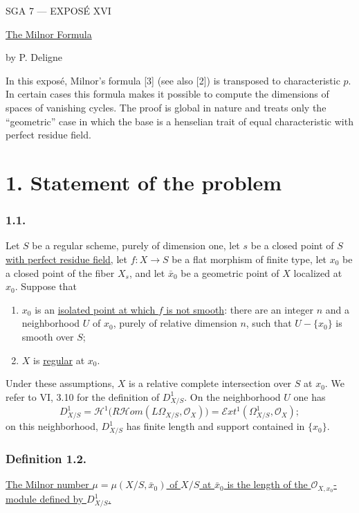 \clearpage
\begin{center}
{\large SGA 7 --- EXPOS\'E XVI}\par
\vspace{2em}
{\Large\underline{The Milnor Formula}}\par
\vspace{1.5em}
{\large by P. Deligne}
\end{center}

\medskip
In this expos\'e, Milnor's formula [3] (see also [2]) is transposed
to characteristic $p$.  In certain cases this formula makes it
possible to compute the dimensions of spaces of vanishing cycles.
The proof is global in nature and treats only the ``geometric'' case
in which the base is a henselian trait of equal characteristic with
perfect residue field.

\section*{1. Statement of the problem}

\subsubsection*{1.1.}
Let $S$ be a regular scheme, purely of dimension one, let $s$ be a
closed point of $S$ \underline{with perfect residue field}, let
$f:X\to S$ be a flat morphism of finite type, let $x_0$ be a closed
point of the fiber $X_s$, and let $\bar x_0$ be a geometric point of
$X$ localized at $x_0$.  Suppose that
\begin{enumerate}
\item[(a)] $x_0$ is an \underline{isolated point at which $f$ is not
smooth}: there are an integer $n$ and a neighborhood $U$ of $x_0$,
purely of relative dimension $n$, such that $U-\{x_0\}$ is smooth
over $S$;
\item[(b)] $X$ is \underline{regular} at $x_0$.
\end{enumerate}

Under these assumptions, $X$ is a relative complete intersection
over $S$ at $x_0$.  We refer to VI, 3.10 for the definition of
$D^1_{X/S}$.  On the neighborhood $U$ one has
\[
D^1_{X/S}
=\mathcal H^1\bigl(R\mathcal Hom(L\Omega_{X/S},\mathcal O_X)\bigr)
=\mathcal Ext^1(\Omega^1_{X/S},\mathcal O_X);
\]
on this neighborhood, $D^1_{X/S}$ has finite length and support
contained in $\{x_0\}$.

\subsubsection*{Definition 1.2.}
\underline{The Milnor number
$\mu=\mu(X/S,\bar x_0)$ of $X/S$ at $\bar x_0$ is the length of the
$\mathcal O_{X,x_0}$-module defined by $D^1_{X/S}$.}

